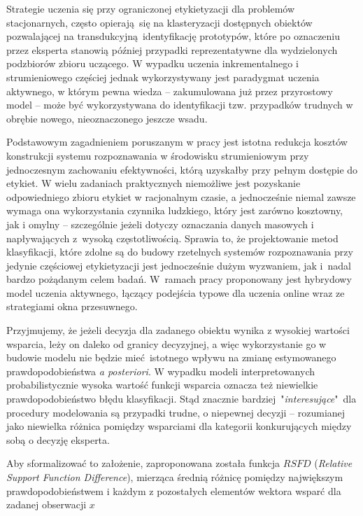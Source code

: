 Strategie uczenia się przy ograniczonej etykietyzacji dla problemów stacjonarnych, często opierają się na klasteryzacji dostępnych obiektów pozwalającej na transdukcyjną identyfikację prototypów, które po oznaczeniu przez eksperta stanowią później przypadki reprezentatywne dla wydzielonych podzbiorów zbioru uczącego. W wypadku uczenia inkrementalnego i strumieniowego częściej jednak wykorzystywany jest paradygmat uczenia aktywnego, w którym pewna wiedza -- zakumulowana już przez przyrostowy model -- może być wykorzystywana do identyfikacji tzw. przypadków trudnych w obrębie nowego, nieoznaczonego jeszcze wsadu.

Podstawowym zagadnieniem poruszanym w pracy jest istotna redukcja kosztów konstrukcji systemu rozpoznawania w środowisku strumieniowym przy jednoczesnym zachowaniu efektywności, którą uzyskałby przy pełnym dostępie do etykiet. W wielu zadaniach praktycznych niemożliwe jest pozyskanie odpowiedniego zbioru etykiet w racjonalnym czasie, a jednocześnie niemal zawsze wymaga ona wykorzystania czynnika ludzkiego, który jest zarówno kosztowny, jak i omylny -- szczególnie jeżeli dotyczy oznaczania danych masowych i napływających z~wysoką częstotliwością. Sprawia to, że projektowanie metod klasyfikacji, które zdolne są do budowy rzetelnych systemów rozpoznawania przy jedynie częściowej etykietyzacji jest jednocześnie dużym wyzwaniem, jak i~nadal bardzo pożądanym celem badań. W~ramach pracy proponowany jest hybrydowy model uczenia aktywnego, łączący podejścia typowe dla uczenia online wraz ze strategiami okna przesuwnego.

Przyjmujemy, że jeżeli decyzja dla zadanego obiektu wynika z wysokiej wartości wsparcia, leży on daleko od granicy decyzyjnej, a więc wykorzystanie go w budowie modelu nie będzie mieć istotnego wpływu na zmianę estymowanego prawdopodobieństwa \emph{a posteriori}. W wypadku modeli interpretowanych probabilistycznie wysoka wartość funkcji wsparcia oznacza też niewielkie prawdopodobieństwo błędu klasyfikacji. Stąd znacznie bardziej~"\emph{interesujące}"~dla procedury modelowania są przypadki trudne, o niepewnej decyzji -- rozumianej jako niewielka różnica pomiędzy wsparciami dla kategorii konkurujących między sobą o decyzję eksperta. 

Aby sformalizować to założenie, zaproponowana została funkcja $RSFD$ (\emph{Relative Support Function Difference}), mierząca średnią różnicę pomiędzy największym prawdopodobieństwem i każdym z pozostałych elementów wektora wsparć dla zadanej obserwacji $x$

